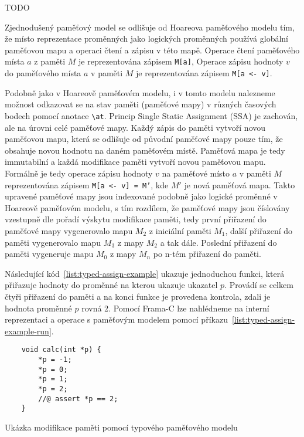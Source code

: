TODO

Zjednodušený paměťový model se odlišuje od Hoareova paměťového modelu tím,
že místo reprezentace proměnných jako logických proměnných
používá globální paměťovou mapu a operaci čtení a zápisu v této mapě.
Operace čtení paměťového místa $a$ z paměti $M$ je reprezentována zápisem \texttt{M[a]},
Operace zápisu hodnoty $v$ do paměťového místa $a$ v paměti $M$ je reprezentována zápisem \texttt{M[a <- v]}.


Podobně jako v Hoareově paměťovém modelu,
i v tomto modelu nalezneme možnost odkazovat se na stav paměti (paměťové mapy)
v různých časových bodech pomocí anotace \texttt{\textbackslash at}.
Princip Single Static Assignment (SSA) je zachován, ale na úrovni celé paměťové mapy.
Každý zápis do paměti vytvoří novou paměťovou mapu,
která se odlišuje od původní paměťové mapy pouze tím,
že obsahuje novou hodnotu na daném paměťovém místě.
Paměťová mapa je tedy immutabilní a každá modifikace paměti vytvoří novou paměťovou mapu.
Formálně je tedy operace zápisu hodnoty $v$ na paměťové místo $a$ v paměti $M$ reprezentována zápisem
\texttt{M[a <- v] = M'}, kde $M'$ je nová paměťová mapa.
Takto upravené paměťové mapy jsou indexované podobně jako logické proměnné v Hoareově paměťovém modelu,
s tím rozdílem, že paměťové mapy jsou číslovány vzestupně dle pořadí výskytu modifikace paměti,
tedy první přiřazení do paměťové mapy vygenerovalo mapu $M_2$ z iniciální paměti $M_1$,
další přiřazení do paměti vygenerovalo mapu $M_3$ z mapy $M_2$ a tak dále.
Poslední přiřazení do paměti vygeneruje mapu $M_0$ z mapy $M_n$ po n-tém přiřazení do paměti.

Následující kód~\ref{list:typed-assign-example} ukazuje jednoduchou funkci,
která přiřazuje hodnoty do proměnné na kterou ukazuje ukazatel $p$.
Provádí se celkem čtyři přiřazení do paměti a na konci funkce je provedena kontrola,
zdali je hodnota proměnné $p$ rovná 2.
Pomocí Frama\mbox{-}C lze nahlédneme na interní reprezentaci
a operace s paměťovým modelem pomocí příkazu~\ref{list:typed-assign-example-run}.

\begin{listing}[H]
    \begin{verbatim}
    void calc(int *p) {
        *p = -1;
        *p = 0;
        *p = 1;
        *p = 2;
        //@ assert *p == 2;
    }
    \end{verbatim}
    \caption{Ukázka modifikace paměti pomocí typového paměťového modelu}
    \label{list:typed-assign-example}
\end{listing}

